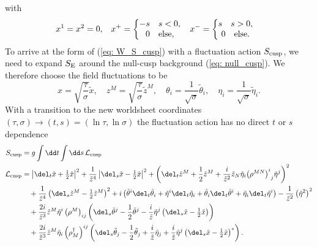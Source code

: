 %
%
with
%
%
\begin{align}
x^{1}&=x^{2}=0, & 
x^{+}&=\left\lbrace
\begin{matrix}
-s\quad s<0, \\
0\quad {\rm else,}
\end{matrix} \right. &
x^{-}&=\left\lbrace
\begin{matrix}
s\quad s>0, \\
0\quad {\rm else.}
\end{matrix} \right.
\end{align}
%
%
To arrive at the form of (\ref{eq: W_S_cusp}) with a fluctuation action $S_{\rm cusp}$, we need to expand $S_{\rm E}$ around the null-cusp background (\ref{eq: null_cusp}). We therefore choose the field fluctuations to be
%
%
\begin{equation}
x=\sqrt{\frac{\tau}{\sigma}}\tilde{x}, \quad z^{M}=\sqrt{\frac{\tau}{\sigma}}\tilde{z}^{M}, \quad \theta_{i}=\frac{1}{\sqrt{\sigma}}\tilde{\theta}_{i}, \quad \eta_{i} = \frac{1}{\sqrt{\sigma}}\tilde{\eta}_{i}.
\end{equation}
%
%
With a transition to the new worldsheet coordinates ${(\tau,\sigma)\to (t,s)=(\ln\tau , \ln \sigma)}$ the fluctuation action has no direct $t$ or $s$ dependence
%
%
\begin{align}
S_{\rm cusp} &= g \int \dd t \int \dd s \, \mathcal{L}_{\rm cusp} \label{eq: cusp_action} \\
%
%
\mathcal{L}_{\rm cusp} &= \left\vert \del_{t}\tilde{x} + \tfrac{1}{2}\tilde{x} \right\vert^{2} + \frac{1}{\tilde{z}^{4}}\left\vert \del_{s}\tilde{x} - \tfrac{1}{2}\tilde{x} \right\vert^{2} + \left( \del_{t}\tilde{z}^{M} + \frac{1}{2}\tilde{z}^{M} + \frac{i}{\tilde{z}^{2}}\tilde{z}_{N}\tilde{\eta}_{i} {\left(\rho^{MN}\right)^{i}}_{j} \tilde{\eta}^{j}\right)^{2} \notag \\
%
%
&\quad +\frac{1}{\tilde{z}^{4}}\left( \del_{s}\tilde{z}^{M} - \tfrac{1}{2} \tilde{z}^{M}\right)^{2} + i \left( \tilde{\theta}^{i}\del_{t}\tilde{\theta}_{i} + \tilde{\eta}^{i}\del_{t}\tilde{\eta}_{i} + \tilde{\theta}_{i}\del_{t}\tilde{\theta}^{i} + \tilde{\eta}_{i}\del_{t}\tilde{\eta}^{i}\right) - \frac{1}{\tilde{z}^{2}}\left(\tilde{\eta}^{2}\right)^{2} \notag \\
%
%
&\quad + \frac{2i}{\tilde{z}^{3}}\tilde{z}^{M}\tilde{\eta}^{i} \left(\rho^{M}\right)_{ij} \left( \del_{s}\tilde{\theta}^{j} - \frac{1}{2}\tilde{\theta}^{j} - \frac{i}{\tilde{z}} \tilde{\eta}^{j} \left(\del_{s}\tilde{x}- \tfrac{1}{2}\tilde{x}\right)\right) \notag \\
%
%
&\quad + \frac{2i}{\tilde{z}^{3}}\tilde{z}^{M}\tilde{\eta}_{i}\left(\rho_{M}^{\dagger}\right)^{ij} \left( \del_{s}\tilde{\theta}_{j} - \frac{1}{2} \tilde{\theta}_{j} + \frac{i}{\tilde{z}}\tilde{\eta}_{j} + \frac{i}{\tilde{z}} \tilde{\eta}^{j} \left(\del_{s}\tilde{x}- \tfrac{1}{2}\tilde{x}\right)^{*} \right). \notag
\end{align}
